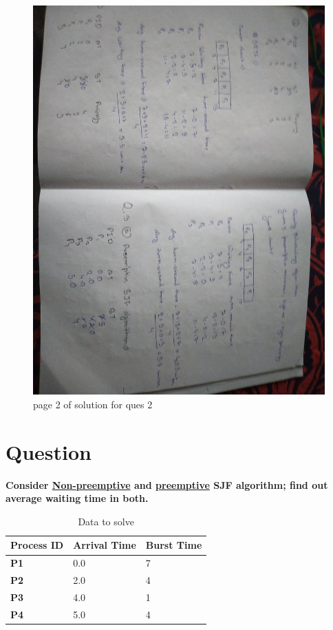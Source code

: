 \documentclass[11pt,a4paper,oneside]{article}
\begin{document}
\begin{figure}[hbt!]
	\centering
	\includegraphics[width=1\textwidth]{images/red_images/q2i2.jpg}
	\caption{page 2 of solution for ques 2}
\end{figure}

\clearpage

\section{Question}

\bgroup \bfseries
\noindent Consider \underline{Non-preemptive} and \underline{preemptive} SJF algorithm; find out average waiting time in both.
\egroup{}

\begin{center}
	\begin{table}[h]
		\begin{tabular}{ ||>{\bfseries} m{7em} || m{10em} || m{12em} ||}
			\hline
			Process ID & \textbf{Arrival Time} & \textbf{Burst Time} \\
			\hline
			P1 & 0.0 & 7 \\
			\hline
			P2 & 2.0 & 4 \\
			\hline
			P3 & 4.0 & 1 \\
			\hline
			P4 & 5.0 & 4 \\
			\hline
		\end{tabular}
		\caption{Data to solve}
	\end{table}
\end{center}
\end{document}

